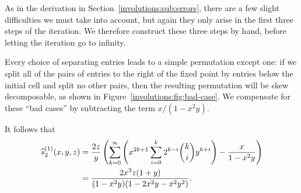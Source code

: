     As in the derivation in Section~\ref{involutions:sub:errors}, there are a
    few slight difficulties we must take into account, but again they only
    arise in the first three steps of the iteration. We therefore construct
    these three steps by hand, before letting the iteration go to infinity. 

    Every choice of separating entries leads to a simple permutation except
    one: if we split all of the pairs of entries to the right of the fixed point by
    entries below the initial cell and split no other pairs, then the resulting
    permutation will be skew decomposable, as shown in
    Figure~\ref{involutions:fig:bad-case}. We compensate for these ``bad cases'' by
    subtracting the term $x/(1 - x^2y)$. 



    It follows that
    $$ \begin{aligned}
      \widehat{s}^{(1)}_2(x,y,z)
      &=
      \frac{2z}{y}\left(\sum_{k=0}^\infty \left(x^{2k+1}\sum_{i=0}^k
          2^{k-i}{k\choose i}y^{k+i}\right) - \frac{x}{1-x^2y}\right)\\ 
      &=
      \frac{2x^3z(1+y)}{(1-x^2y)(1-2x^2y-x^2y^2)}.
    \end{aligned} $$



